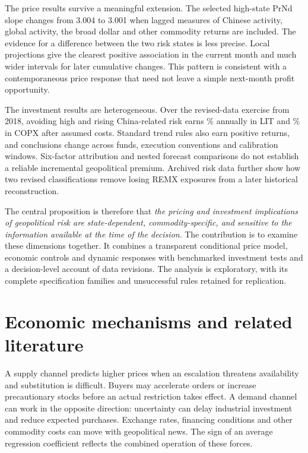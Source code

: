 The price results survive a meaningful extension. The selected high-state PrNd slope changes from 3.004 to 3.001 when lagged measures of Chinese activity, global activity, the broad dollar and other commodity returns are included. The evidence for a difference between the two risk states is less precise. Local projections give the clearest positive association in the current month and much wider intervals for later cumulative changes. This pattern is consistent with a contemporaneous price response that need not leave a simple next-month profit opportunity.

The investment results are heterogeneous. Over the revised-data exercise from 2018, avoiding high and rising China-related risk earns \OosLitAvoidCagr\% annually in LIT and \OosCopxAvoidCagr\% in COPX after assumed costs. Standard trend rules also earn positive returns, and conclusions change across funds, execution conventions and calibration windows. Six-factor attribution and nested forecast comparisons do not establish a reliable incremental geopolitical premium. Archived risk data further show how two revised classifications remove losing REMX exposures from a later historical reconstruction.

The central proposition is therefore that \textit{the pricing and investment implications of geopolitical risk are state-dependent, commodity-specific, and sensitive to the information available at the time of the decision}. The contribution is to examine these dimensions together. It combines a transparent conditional price model, economic controls and dynamic responses with benchmarked investment tests and a decision-level account of data revisions. The analysis is exploratory, with its complete specification families and unsuccessful rules retained for replication.

\section{Economic mechanisms and related literature}

A supply channel predicts higher prices when an escalation threatens availability and substitution is difficult. Buyers may accelerate orders or increase precautionary stocks before an actual restriction takes effect. A demand channel can work in the opposite direction: uncertainty can delay industrial investment and reduce expected purchases. Exchange rates, financing conditions and other commodity costs can move with geopolitical news. The sign of an average regression coefficient reflects the combined operation of these forces.

